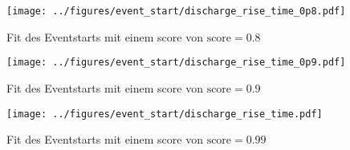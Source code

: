 \begin{figure}[H]
    \centering
    \begin{minipage}[t]{0.32\textwidth}
        \centering
        \texttt{[image: ../figures/event\_start/discharge\_rise\_time\_0p8.pdf]}
        \caption{Fit des Eventstarts mit einem score von \(\text{score}=0.8\)}
        \label{fig:discharge_rise_time_0p8}
    \end{minipage}
    \hfill
    \begin{minipage}[t]{0.32\textwidth}
        \centering
        \texttt{[image: ../figures/event\_start/discharge\_rise\_time\_0p9.pdf]}
        \caption{Fit des Eventstarts mit einem score von \(\text{score}=0.9\)}
        \label{fig:discharge_rise_time_0p9}
    \end{minipage}
    \hfill
 \begin{minipage}[t]{0.32\textwidth}
        \centering
        \texttt{[image: ../figures/event\_start/discharge\_rise\_time.pdf]}

        \caption{Fit des Eventstarts mit einem score von \(\text{score}=0.99\)}
        \label{fig:discharge_rise_time}
    \end{minipage}

\end{figure}


